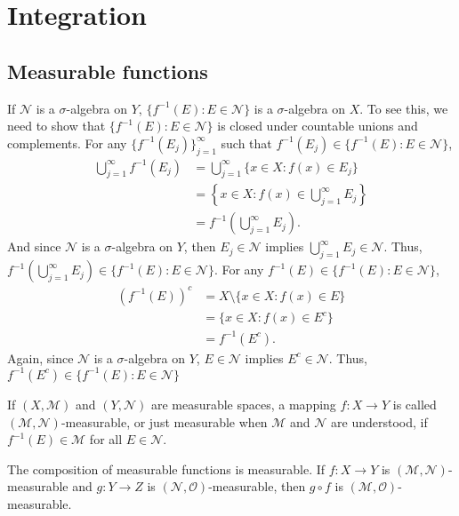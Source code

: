 \setchapterpreamble[u]{\margintoc}
\chapter{Integration}

\section{Measurable functions}

If $\mathcal{N}$ is a $\sigma$-algebra on $Y$, $\{ f^{-1}(E): E \in \mathcal{N} \}$ is a $\sigma$-algebra on $X$.
To see this, we need to show that $\{ f^{-1}(E): E \in \mathcal{N} \}$ is closed under countable unions and complements.
For any $\{ f^{-1}(E_j) \}_{j=1}^{\infty}$ such that $f^{-1}(E_j) \in \{ f^{-1}(E): E \in \mathcal{N} \}$, 
\begin{align}
    \bigcup_{j=1}^{\infty} f^{-1}(E_j) & = \bigcup_{j=1}^{\infty} \{ x \in X: f(x) \in E_j \} \\
    & = \left\{ x \in X: f(x) \in \bigcup_{j=1}^{\infty} E_j \right\} \\
    & = f^{-1} \left( \bigcup_{j=1}^{\infty} E_j \right).
\end{align}
And since $\mathcal{N}$ is a $\sigma$-algebra on $Y$, then $E_j \in \mathcal{N}$ implies $\bigcup_{j=1}^{\infty} E_j \in \mathcal{N}$.
Thus, $f^{-1}(\bigcup_{j=1}^{\infty} E_j) \in \{ f^{-1}(E): E \in \mathcal{N} \}$.
For any $f^{-1}(E) \in \{ f^{-1}(E): E \in \mathcal{N} \}$, 
\begin{align}
    \left( f^{-1}(E) \right)^c & = X \setminus \{ x \in X: f(x) \in E \} \\
    & = \{ x \in X: f(x) \in E^c \} \\
    &= f^{-1}(E^c).
\end{align}
Again, since $\mathcal{N}$ is a $\sigma$-algebra on $Y$, $E \in \mathcal{N}$ implies $E^c \in \mathcal{N}$.
Thus, $f^{-1}(E^c) \in \{ f^{-1}(E): E \in \mathcal{N} \}$


\begin{definition}
    If $(X, \mathcal{M})$ and $(Y, \mathcal{N})$ are measurable spaces, a mapping $f: X \to Y$ is called $(\mathcal{M}, \mathcal{N})$-measurable, or just measurable when $\mathcal{M}$ and $\mathcal{N}$ are understood, if $f^{-1}(E) \in \mathcal{M}$ for all $E \in \mathcal{N}$.
\end{definition}

The composition of measurable functions is measurable.
If $f: X \to Y$ is $(\mathcal{M}, \mathcal{N})$-measurable and $g: Y \to Z$ is $(\mathcal{N}, \mathcal{O})$-measurable, then $g \circ f$ is $(\mathcal{M}, \mathcal{O})$-measurable.

